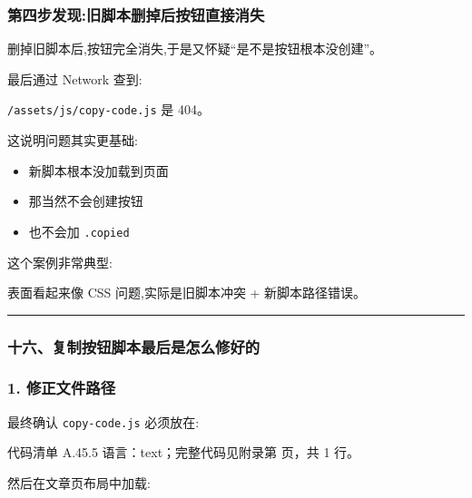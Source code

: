 \documentclass[lang=cn,scheme=chinese,color=blue,device=normal,toc=onecol,math=cm]{elegantbook}
\begin{document}
\subsubsection{第四步发现:旧脚本删掉后按钮直接消失}


删掉旧脚本后,按钮完全消失,于是又怀疑“是不是按钮根本没创建”。\par


最后通过 Network 查到:\par


\begin{quotebox}
\texttt{/\allowbreak{}assets/\allowbreak{}js/\allowbreak{}copy-code.js} 是 404。\par
\end{quotebox}


这说明问题其实更基础:\par


\begin{itemize}
\item 新脚本根本没加载到页面
\item 那当然不会创建按钮
\item 也不会加 \texttt{.copied}
\end{itemize}


这个案例非常典型:\par


\begin{quotebox}
表面看起来像 CSS 问题,实际是旧脚本冲突 + 新脚本路径错误。\par
\end{quotebox}


\medskip\hrule\medskip


\subsubsection{十六、复制按钮脚本最后是怎么修好的}


\subsubsection{1. 修正文件路径}


最终确认 \texttt{copy-code.js} 必须放在:\par


\begin{codeindexbox}{代码清单 A.45.5}
语言：text；完整代码见附录第 \pageref{code:45:5} 页，共 1 行。
\end{codeindexbox}


然后在文章页布局中加载:\par
\end{document}
